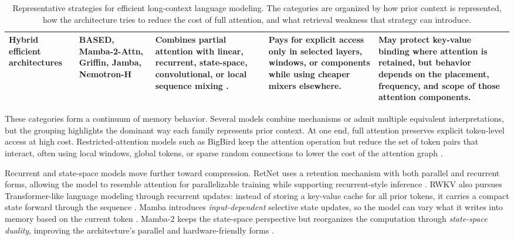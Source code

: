 \documentclass[10pt]{article}
\begin{document}
\begin{table}[H]
\begin{tabularx}{\textwidth}{
>{\raggedright\arraybackslash}p{2.35cm}
>{\raggedright\arraybackslash}p{2.65cm}
>{\raggedright\arraybackslash}X
>{\raggedright\arraybackslash}p{3.0cm}
>{\raggedright\arraybackslash}X}
\midrule
Hybrid efficient architectures &
BASED, Mamba-2-Attn, Griffin, Jamba, Nemotron-H &
Combines partial attention with linear, recurrent, state-space, convolutional,
or local sequence mixing
\cite{arora2024based,dao2024mamba2,de2024griffin,lieber2024jamba,nvidia2025nemotron}. &
Pays for explicit access only in selected layers, windows, or components while
using cheaper mixers elsewhere. &
May protect key-value binding where attention is retained, but behavior depends
on the placement, frequency, and scope of those attention components. \\
\bottomrule
\end{tabularx}
\caption{Representative strategies for efficient long-context language
modeling. The categories are organized by how prior context is represented,
how the architecture tries to reduce the cost of full attention, and what
retrieval weakness that strategy can introduce.}
\label{tab:model-landscape}
\end{table}

These categories form a continuum of memory behavior. Several models combine
mechanisms or admit multiple equivalent interpretations, but the grouping
highlights the dominant way each family represents prior context. At one end,
full attention preserves explicit token-level access at high cost.
Restricted-attention models such as BigBird keep the attention operation but
reduce the set of token pairs that interact, often using local windows, global
tokens, or sparse random connections to lower the cost of the attention graph
\cite{zaheer2020bigbird}.

Recurrent and state-space models move further toward compression. RetNet uses
a retention mechanism with both parallel and recurrent forms, allowing the
model to resemble attention for parallelizable training while supporting recurrent-style
inference \cite{sun2023retnet}. RWKV also pursues Transformer-like language
modeling through recurrent updates: instead of storing a key-value cache for
all prior tokens, it carries a compact state forward through the sequence
\cite{peng2023rwkv}. Mamba introduces \textit{input-dependent} selective state updates,
so the model can vary what it writes into memory based on the current token
\cite{gu2023mamba}. Mamba-2 keeps the state-space perspective but reorganizes
the computation through \textit{state-space duality}, improving the architecture's
parallel and hardware-friendly forms \cite{dao2024mamba2}.
\end{document}
